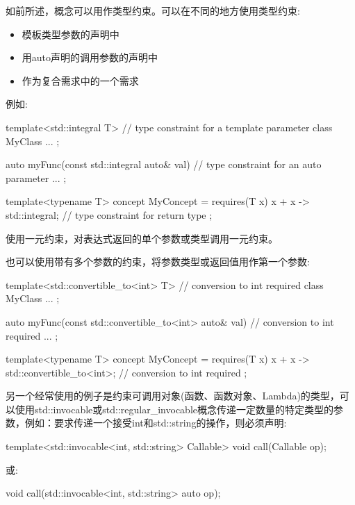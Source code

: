 如前所述，概念可以用作类型约束。可以在不同的地方使用类型约束:

\begin{itemize}
\item
模板类型参数的声明中

\item
用auto声明的调用参数的声明中

\item
作为复合需求中的一个需求
\end{itemize}

例如:

\begin{cpp}
template<std::integral T> // type constraint for a template parameter
class MyClass {
	...
};

auto myFunc(const std::integral auto& val) { // type constraint for an auto parameter
	...
};

template<typename T>
concept MyConcept = requires(T x) {
		{ x + x } -> std::integral; // type constraint for return type
	};
\end{cpp}

使用一元约束，对表达式返回的单个参数或类型调用一元约束。


也可以使用带有多个参数的约束，将参数类型或返回值用作第一个参数:

\begin{cpp}
template<std::convertible_to<int> T> // conversion to int required
class MyClass {
	...
};

auto myFunc(const std::convertible_to<int> auto& val) { // conversion to int required
	...
};

template<typename T>
concept MyConcept = requires(T x) {
		{ x + x } -> std::convertible_to<int>; // conversion to int required
	};
\end{cpp}

另一个经常使用的例子是约束可调用对象(函数、函数对象、Lambda)的类型，可以使用std::invocable或std::regular\_invocable概念传递一定数量的特定类型的参数，例如：要求传递一个接受int和std::string的操作，则必须声明:

\begin{cpp}
template<std::invocable<int, std::string> Callable>
void call(Callable op);
\end{cpp}

或:

\begin{cpp}
void call(std::invocable<int, std::string> auto op);
\end{cpp}

